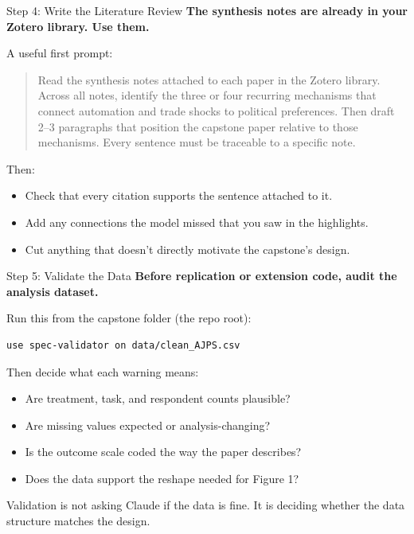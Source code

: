 \documentclass[aspectratio=169, 11pt]{beamer}
\begin{document}
\begin{frame}{Step 4: Write the Literature Review}
  \textbf{The synthesis notes are already in your Zotero library. Use them.}

  \vspace{0.5em}
  A useful first prompt:
  \begin{quote}\small
    Read the synthesis notes attached to each paper in the Zotero library.
    Across all notes, identify the three or four recurring mechanisms that
    connect automation and trade shocks to political preferences. Then draft
    2--3 paragraphs that position the capstone paper relative to those
    mechanisms. Every sentence must be traceable to a specific note.
  \end{quote}

  \vspace{0.4em}
  Then:
  \begin{itemize}\small
    \item Check that every citation supports the sentence attached to it.
    \item Add any connections the model missed that you saw in the highlights.
    \item Cut anything that doesn't directly motivate the capstone's design.
  \end{itemize}
\end{frame}

\begin{frame}[fragile]{Step 5: Validate the Data}
  \textbf{Before replication or extension code, audit the analysis dataset.}

  \vspace{0.4em}
  Run this from the capstone folder (the repo root):
  \begin{lstlisting}[basicstyle=\ttfamily\scriptsize]
use spec-validator on data/clean_AJPS.csv
  \end{lstlisting}

  \vspace{0.4em}
  Then decide what each warning means:
  \begin{itemize}\small
    \item Are treatment, task, and respondent counts plausible?
    \item Are missing values expected or analysis-changing?
    \item Is the outcome scale coded the way the paper describes?
    \item Does the data support the reshape needed for Figure 1?
  \end{itemize}

  \vspace{0.4em}
  \alert{\small Validation is not asking Claude if the data is fine. It is deciding whether the data structure matches the design.}
\end{frame}
\end{document}
